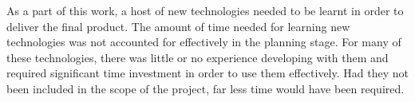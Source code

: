 As a part of this work, a host of new technologies needed to be learnt in order to deliver the final product.
The amount of time needed for learning new technologies was not accounted for effectively in the planning stage.
For many of these technologies, there was little or no experience developing with them
and required significant time investment in order to use them effectively.
Had they not been included in the scope of the project, far less time would have been required.
